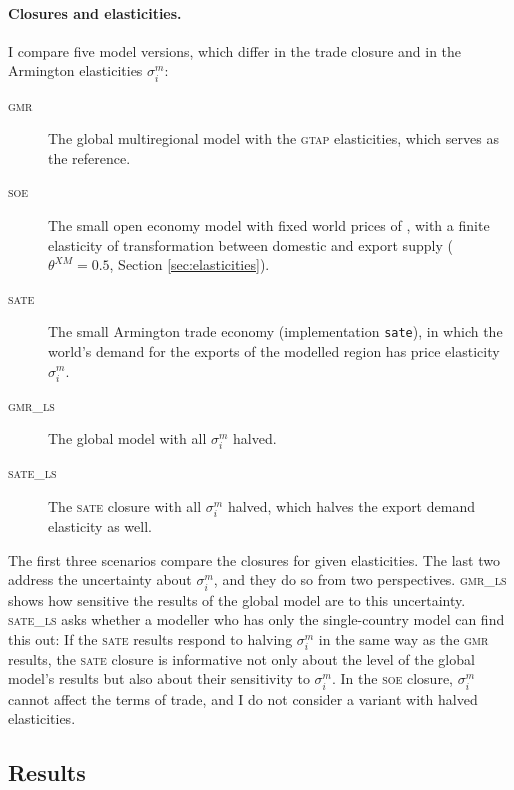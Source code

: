 \documentclass{jgea}
\newcommand{\SOE}{\textsc{soe}\xspace}
\newcommand{\SATE}{\textsc{sate}\xspace}
\newcommand{\GMR}{\textsc{gmr}\xspace}
\newcommand{\GMRLS}{\textsc{gmr\_ls}\xspace}
\newcommand{\SATELS}{\textsc{sate\_ls}\xspace}
\newcommand{\GTAP}{\textsc{gtap}\xspace}
\begin{document}
\paragraph{\bf Closures and elasticities.}
I compare five model versions, which differ in the trade closure and in the Armington elasticities $\sigma^m_i$:
\begin{description}
\item[\GMR] The global multiregional model with the \GTAP elasticities, which serves as the reference.
\item[\SOE] The small open economy model with fixed world prices of \citet{LanzRutherford2016}, with a finite elasticity of transformation between domestic and export supply ($\theta^{XM}=0.5$, Section \ref{sec:elasticities}).
\item[\SATE] The small Armington trade economy (implementation \texttt{sate}), in which the world's demand for the exports of the modelled region has price elasticity $\sigma^m_i$.
\item[\GMRLS] The global model with all $\sigma^m_i$ halved.
\item[\SATELS] The \SATE closure with all $\sigma^m_i$ halved, which halves the export demand elasticity as well.
\end{description}
The first three scenarios compare the closures for given elasticities.
The last two address the uncertainty about $\sigma^m_i$, and they do so from two perspectives.
\GMRLS shows how sensitive the results of the global model are to this uncertainty.
\SATELS asks whether a modeller who has only the single-country model can find this out:
If the \SATE results respond to halving $\sigma^m_i$ in the same way as the \GMR results, the \SATE closure is informative not only about the level of the global model's results but also about their sensitivity to $\sigma^m_i$.
In the \SOE closure, $\sigma^m_i$ cannot affect the terms of trade, and I do not consider a variant with halved elasticities.

\subsection{Results}\label{sec:results}
\end{document}
